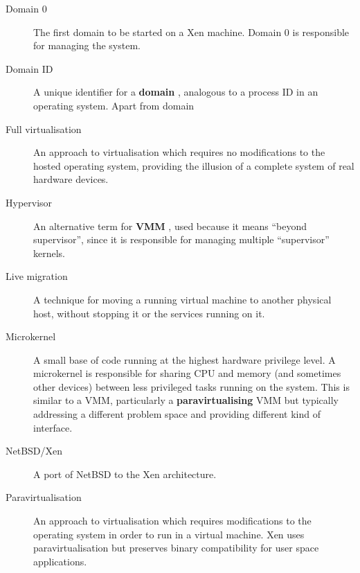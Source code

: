\documentclass[11pt,twoside,final,openright]{xenstyle}
\begin{document}
{\begin{description}
\item[Domain 0]            The first domain to be started on a Xen
                           machine.  Domain 0 is responsible for managing
                           the system.

\item[Domain ID]           A unique identifier for a { \bf domain },
                           analogous to a process ID in an operating
                           system.  Apart from domain

\item[Full virtualisation] An approach to virtualisation which
                           requires no modifications to the hosted
                           operating system, providing the illusion of
                           a complete system of real hardware devices.

\item[Hypervisor]          An alternative term for { \bf VMM }, used
                           because it means ``beyond supervisor'',
                           since it is responsible for managing multiple
                           ``supervisor'' kernels.

\item[Live migration]      A technique for moving a running virtual
                           machine to another physical host, without
			   stopping it or the services running on it.

\item[Microkernel]         A small base of code running at the highest
                           hardware privilege level.  A microkernel is
                           responsible for sharing CPU and memory (and
                           sometimes other devices) between less
                           privileged tasks running on the system.
                           This is similar to a VMM, particularly a
                           {\bf paravirtualising} VMM but typically
                           addressing a different problem space and
                           providing different kind of interface.

\item[NetBSD/Xen]          A port of NetBSD to the Xen architecture.

\item[Paravirtualisation]  An approach to virtualisation which requires
                           modifications to the operating system in
                           order to run in a virtual machine.  Xen
                           uses paravirtualisation but preserves
                           binary compatibility for user space
                           applications.


\end{description}}
\end{document}
